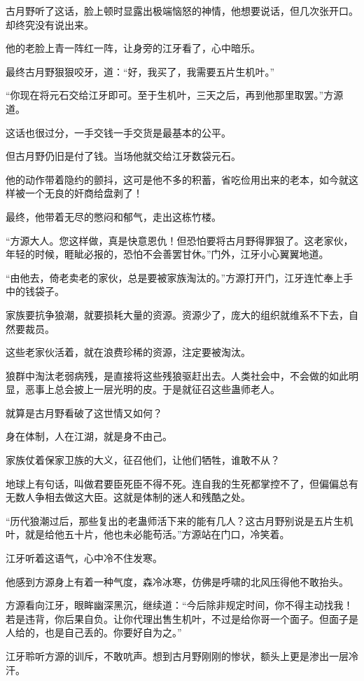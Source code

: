 \begin{this_body}
古月野听了这话，脸上顿时显露出极端恼怒的神情，他想要说话，但几次张开口。却终究没有说出来。

他的老脸上青一阵红一阵，让身旁的江牙看了，心中暗乐。

最终古月野狠狠咬牙，道：“好，我买了，我需要五片生机叶。”

“你现在将元石交给江牙即可。至于生机叶，三天之后，再到他那里取罢。”方源道。

这话也很过分，一手交钱一手交货是最基本的公平。

但古月野仍旧是付了钱。当场他就交给江牙数袋元石。

他的动作带着隐约的颤抖，这可是他不多的积蓄，省吃俭用出来的老本，如今就这样被一个无良的奸商给盘剥了！

最终，他带着无尽的憋闷和郁气，走出这栋竹楼。

“方源大人。您这样做，真是快意恩仇！但恐怕要将古月野得罪狠了。这老家伙，年轻的时候，睚眦必报的，恐怕不会善罢甘休。”门外，江牙小心翼翼地道。

“由他去，倚老卖老的家伙，总是要被家族淘汰的。”方源打开门，江牙连忙奉上手中的钱袋子。

家族要抗争狼潮，就要损耗大量的资源。资源少了，庞大的组织就维系不下去，自然要裁员。

这些老家伙活着，就在浪费珍稀的资源，注定要被淘汰。

狼群中淘汰老弱病残，是直接将这些残狼驱赶出去。人类社会中，不会做的如此明显，恶事上总会披上一层光明的皮。于是就征召这些蛊师老人。

就算是古月野看破了这世情又如何？

身在体制，人在江湖，就是身不由己。

家族仗着保家卫族的大义，征召他们，让他们牺牲，谁敢不从？

地球上有句话，叫做君要臣死臣不得不死。连自我的生死都掌控不了，但偏偏总有无数人争相去做这大臣。这就是体制的迷人和残酷之处。

“历代狼潮过后，那些复出的老蛊师活下来的能有几人？这古月野别说是五片生机叶，就是给他五十片，他也未必能苟活。”方源站在门口，冷笑着。

江牙听着这语气，心中冷不住发寒。

他感到方源身上有着一种气度，森冷冰寒，仿佛是呼啸的北风压得他不敢抬头。

方源看向江牙，眼眸幽深黑沉，继续道：“今后除非规定时间，你不得主动找我！若是违背，你后果自负。让你代理出售生机叶，不过是给你哥一个面子。但面子是人给的，也是自己丢的。你要好自为之。”

江牙聆听方源的训斥，不敢吭声。想到古月野刚刚的惨状，额头上更是渗出一层冷汗。


\end{this_body}
